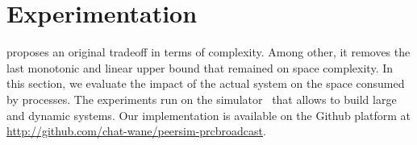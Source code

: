 
\section{Experimentation}
\label{sec:experimentation}

\RPCBROADCAST proposes an original tradeoff in terms of complexity. Among other,
it removes the last monotonic and linear upper bound that remained on space
complexity. In this section, we evaluate the impact of the actual system on the
space consumed by processes. The experiments run on the \PEERSIM
simulator~\cite{montresor2009peersim} that allows to build large and dynamic
systems. Our implementation is available on the Github platform at
\url{http://github.com/chat-wane/peersim-prcbroadcast}. \\


%   



